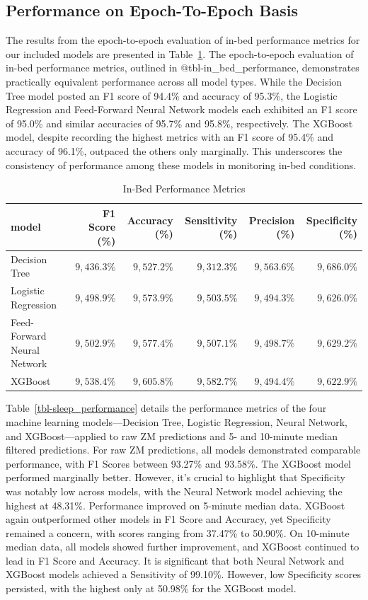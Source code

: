 \documentclass[
  super,
  preprint,
  3p]{elsarticle}
\begin{document}
\hypertarget{performance-on-epoch-to-epoch-basis}{%
\subsection{Performance on Epoch-To-Epoch
Basis}\label{performance-on-epoch-to-epoch-basis}}

The results from the epoch-to-epoch evaluation of in-bed performance
metrics for our included models are presented in
Table~\ref{tbl-in_bed_performance}. The epoch-to-epoch evaluation of
in-bed performance metrics, outlined in @tbl-in\_bed\_performance,
demonstrates practically equivalent performance across all model types.
While the Decision Tree model posted an F1 score of 94.4\% and accuracy
of 95.3\%, the Logistic Regression and Feed-Forward Neural Network
models each exhibited an F1 score of 95.0\% and similar accuracies of
95.7\% and 95.8\%, respectively. The XGBoost model, despite recording
the highest metrics with an F1 score of 95.4\% and accuracy of 96.1\%,
outpaced the others only marginally. This underscores the consistency of
performance among these models in monitoring in-bed conditions.

\hypertarget{tbl-in_bed_performance}{}
\begin{longtable}{lrrrrr}
\caption{\label{tbl-in_bed_performance}In-Bed Performance Metrics }\tabularnewline

\toprule
model & F1 Score (\%) & Accuracy (\%) & Sensitivity (\%) & Precision (\%) & Specificity (\%) \\ 
\midrule
Decision Tree & $9,436.3\%$ & $9,527.2\%$ & $9,312.3\%$ & $9,563.6\%$ & $9,686.0\%$ \\ 
Logistic Regression & $9,498.9\%$ & $9,573.9\%$ & $9,503.5\%$ & $9,494.3\%$ & $9,626.0\%$ \\ 
Feed-Forward Neural Network & $9,502.9\%$ & $9,577.4\%$ & $9,507.1\%$ & $9,498.7\%$ & $9,629.2\%$ \\ 
XGBoost & $9,538.4\%$ & $9,605.8\%$ & $9,582.7\%$ & $9,494.4\%$ & $9,622.9\%$ \\ 
\bottomrule
\end{longtable}

Table~\ref{tbl-sleep_performance} details the performance metrics of the
four machine learning models---Decision Tree, Logistic Regression,
Neural Network, and XGBoost---applied to raw ZM predictions and 5- and
10-minute median filtered predictions. For raw ZM predictions, all
models demonstrated comparable performance, with F1 Scores between
93.27\% and 93.58\%. The XGBoost model performed marginally better.
However, it's crucial to highlight that Specificity was notably low
across models, with the Neural Network model achieving the highest at
48.31\%. Performance improved on 5-minute median data. XGBoost again
outperformed other models in F1 Score and Accuracy, yet Specificity
remained a concern, with scores ranging from 37.47\% to 50.90\%. On
10-minute median data, all models showed further improvement, and
XGBoost continued to lead in F1 Score and Accuracy. It is significant
that both Neural Network and XGBoost models achieved a Sensitivity of
99.10\%. However, low Specificity scores persisted, with the highest
only at 50.98\% for the XGBoost model.
\end{document}
